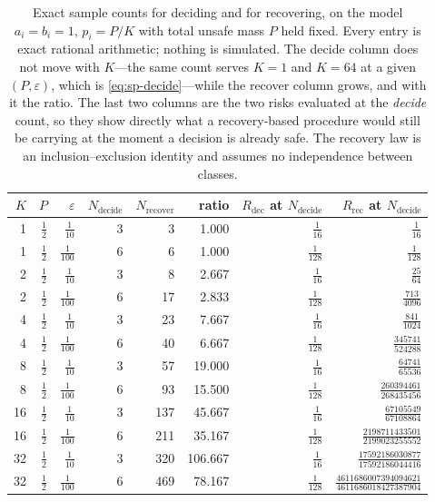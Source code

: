 \documentclass[conference]{IEEEtran}
\theoremstyle{definition}
\begin{document}
\begin{table}[t]
\caption{Exact sample counts for deciding and for recovering, on the model
$a_{i}=b_{i}=1$, $p_{i}=P/K$ with total unsafe mass $P$ held fixed. Every entry is exact
rational arithmetic; nothing is simulated. The decide column does not move with $K$---the
same count serves $K=1$ and $K=64$ at a given $(P,\varepsilon)$, which is
\eqref{eq:sp-decide}---while the recover column grows, and with it the ratio. The last two
columns are the two risks evaluated at the \emph{decide} count, so they show directly what a
recovery-based procedure would still be carrying at the moment a decision is already safe.
The recovery law is an inclusion--exclusion identity and assumes no independence between
classes.}
\label{tab:sp-separation}
\centering
\footnotesize
\setlength{\tabcolsep}{6pt}
\begin{tabular}{@{}rrrrrrrr@{}}
\toprule
$K$ & $P$ & $\varepsilon$ & $N_{\mathrm{decide}}$ & $N_{\mathrm{recover}}$ &
ratio & $R_{\mathrm{dec}}$ at $N_{\mathrm{decide}}$ & $R_{\mathrm{rec}}$ at $N_{\mathrm{decide}}$ \\
\midrule
1 & $\frac{1}{2}$ & $\frac{1}{10}$ & 3 & 3 & 1.000 & $\frac{1}{16}$ & $\frac{1}{16}$ \\
1 & $\frac{1}{2}$ & $\frac{1}{100}$ & 6 & 6 & 1.000 & $\frac{1}{128}$ & $\frac{1}{128}$ \\
2 & $\frac{1}{2}$ & $\frac{1}{10}$ & 3 & 8 & 2.667 & $\frac{1}{16}$ & $\frac{25}{64}$ \\
2 & $\frac{1}{2}$ & $\frac{1}{100}$ & 6 & 17 & 2.833 & $\frac{1}{128}$ & $\frac{713}{4096}$ \\
4 & $\frac{1}{2}$ & $\frac{1}{10}$ & 3 & 23 & 7.667 & $\frac{1}{16}$ & $\frac{841}{1024}$ \\
4 & $\frac{1}{2}$ & $\frac{1}{100}$ & 6 & 40 & 6.667 & $\frac{1}{128}$ & $\frac{345741}{524288}$ \\
8 & $\frac{1}{2}$ & $\frac{1}{10}$ & 3 & 57 & 19.000 & $\frac{1}{16}$ & $\frac{64741}{65536}$ \\
8 & $\frac{1}{2}$ & $\frac{1}{100}$ & 6 & 93 & 15.500 & $\frac{1}{128}$ & $\frac{260394461}{268435456}$ \\
16 & $\frac{1}{2}$ & $\frac{1}{10}$ & 3 & 137 & 45.667 & $\frac{1}{16}$ & $\frac{67105549}{67108864}$ \\
16 & $\frac{1}{2}$ & $\frac{1}{100}$ & 6 & 211 & 35.167 & $\frac{1}{128}$ & $\frac{2198711433501}{2199023255552}$ \\
32 & $\frac{1}{2}$ & $\frac{1}{10}$ & 3 & 320 & 106.667 & $\frac{1}{16}$ & $\frac{17592186030877}{17592186044416}$ \\
32 & $\frac{1}{2}$ & $\frac{1}{100}$ & 6 & 469 & 78.167 & $\frac{1}{128}$ & $\frac{4611686007394094621}{4611686018427387904}$ \\
\bottomrule
\end{tabular}
\end{table}
\end{document}
